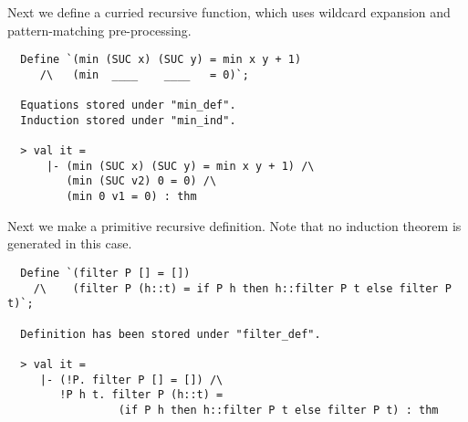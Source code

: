 Next we define a curried recursive function, which uses
wildcard expansion and pattern-matching pre-processing.
%
\begin{hol}
\begin{verbatim}
  Define `(min (SUC x) (SUC y) = min x y + 1)
     /\   (min  ____    ____   = 0)`;

  Equations stored under "min_def".
  Induction stored under "min_ind".

  > val it =
      |- (min (SUC x) (SUC y) = min x y + 1) /\
         (min (SUC v2) 0 = 0) /\
         (min 0 v1 = 0) : thm
\end{verbatim}
\end{hol}

 Next we make a primitive recursive definition. Note that no
induction theorem is generated in this case.
%
\begin{hol}
\begin{verbatim}
  Define `(filter P [] = [])
    /\    (filter P (h::t) = if P h then h::filter P t else filter P t)`;

  Definition has been stored under "filter_def".

  > val it =
     |- (!P. filter P [] = []) /\
        !P h t. filter P (h::t) =
                 (if P h then h::filter P t else filter P t) : thm
\end{verbatim}
\end{hol}

